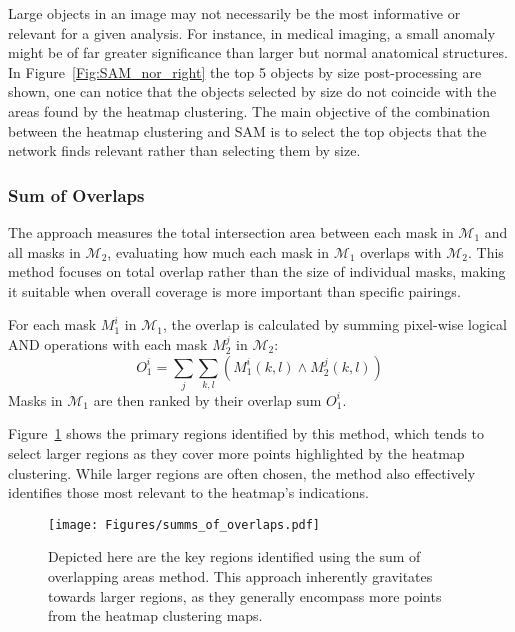 Large objects in an image may not necessarily be the most informative or relevant for a given analysis. For instance, in medical imaging, a small anomaly might be of far greater significance than larger but normal anatomical structures. In Figure~\ref{Fig:SAM_nor_right} the top 5 objects by size post-processing are shown, one can notice that the objects selected by size do not coincide with the areas found by the heatmap clustering. The main objective of the combination between the heatmap clustering and SAM is to select the top objects that the network finds relevant rather than selecting them by size.



\subsubsection{Sum of Overlaps} 

The approach measures the total intersection area between each mask in \(\mathcal{M}_1\) and all masks in \(\mathcal{M}_2\), evaluating how much each mask in \(\mathcal{M}_1\) overlaps with \(\mathcal{M}_2\). This method focuses on total overlap rather than the size of individual masks, making it suitable when overall coverage is more important than specific pairings.

For each mask \( M_1^i \) in \(\mathcal{M}_1\), the overlap is calculated by summing pixel-wise logical AND operations with each mask \( M_2^j \) in \(\mathcal{M}_2\):
\begin{equation*}
    O_1^i = \sum_{j} \sum_{k, l} \left( M_1^i(k, l) \land M_2^j(k, l) \right)
\end{equation*}
Masks in \(\mathcal{M}_1\) are then ranked by their overlap sum \( O_1^i \).


Figure~\ref{Fig:most_relevant} shows the primary regions identified by this method, which tends to select larger regions as they cover more points highlighted by the heatmap clustering. While larger regions are often chosen, the method also effectively identifies those most relevant to the heatmap's indications.
\begin{figure}[ht!]
\begin{center}
\texttt{[image: Figures/summs\_of\_overlaps.pdf]}
\end{center}
\caption{Depicted here are the key regions identified using the sum of overlapping areas method. This approach inherently gravitates towards larger regions, as they generally encompass more points from the heatmap clustering maps.}
\label{Fig:most_relevant}
\end{figure} 

